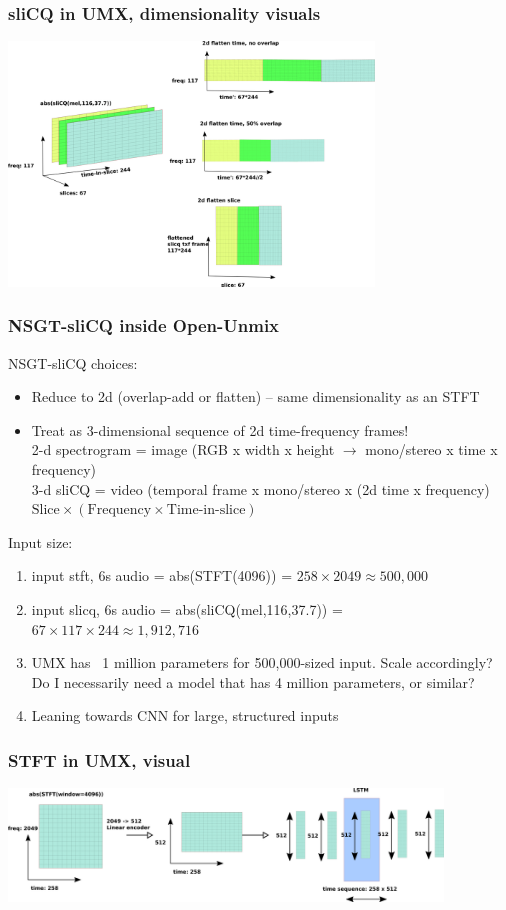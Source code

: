 \documentclass[usenames,dvipsnames]{beamer}
\begin{document}
\begin{frame}
	\frametitle{sliCQ in UMX, dimensionality visuals}
	\includegraphics[height=6.5cm]{./umxslicqdimred.png}
\end{frame}

\begin{frame}
	\frametitle{NSGT-sliCQ inside Open-Unmix}
	NSGT-sliCQ choices:
	\begin{itemize}
		\item
			Reduce to 2d (overlap-add or flatten) -- same dimensionality as an STFT
		\item
			Treat as 3-dimensional sequence of 2d time-frequency frames!\\
			2-d spectrogram = image (RGB x width x height $\rightarrow$ mono/stereo x time x frequency)\\
			3-d sliCQ = video (temporal frame x mono/stereo x (2d time x frequency)\\
			$\text{Slice} \times (\text{Frequency} \times \text{Time-in-slice})$
	\end{itemize}
	Input size:
	\begin{enumerate}
		\item
			input stft, 6s audio = abs(STFT(4096)) = $258 \times 2049 \approx 500,000$
		\item
			input slicq, 6s audio = abs(sliCQ(mel,116,37.7)) = $67 \times 117 \times 244 \approx 1,912,716$
		\item
			UMX has ~1 million parameters for 500,000-sized input. Scale accordingly? Do I necessarily need a model that has 4 million parameters, or similar?
		\item
			Leaning towards CNN for large, structured inputs
	\end{enumerate}
\end{frame}

\begin{frame}
	\frametitle{STFT in UMX, visual}
	\includegraphics[height=3cm]{./umxstftlstm.png}
\end{frame}
\end{document}
